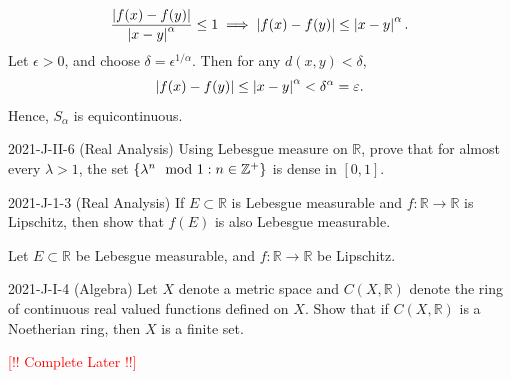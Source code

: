 \documentclass{article}
\begin{document}
\begin{solutions}
\begin{enumerate}[itemsep =-2pt,label = (\roman{*})]
				\begin{equation}
					\frac{\abs{f(x) - f(y)}}{\abs{x - y}^{\alpha}} \leq 1 \implies \abs{f(x) - f(y)} \leq \abs{x -y}^{\alpha}. 
				\end{equation}
			Let $\epsilon > 0$, and choose $\delta = \epsilon^{1/\alpha}$. Then for any $d(x, y) < \delta$, 
				\begin{equation}
					\abs{f(x) - f(y)} \leq \abs{x - y}^{\alpha} < \delta^{\alpha} = \epsilon. 
				\end{equation}
			Hence, $S_{\alpha}$ is equicontinuous. 
		\end{enumerate}
\end{solutions}

\begin{prb}{2021-J-II-6 (Real Analysis)}
	Using Lebesgue measure on $\mathbb{R}$, prove that for almost every $\lambda > 1$, the set $\brac*{\lambda^{n}\mod{1}: n \in \mathbb{Z}^{+}}$ is dense in $[0,1]$. 
\end{prb}


\begin{prb}{2021-J-1-3 (Real Analysis)}
	If $E \subset \mathbb{R}$ is Lebesgue measurable and $f: \mathbb{R} \to \mathbb{R}$ is Lipschitz, then show that $f(E)$ is also Lebesgue measurable. 
\end{prb}
\begin{solutions}
	Let $E \subset \mathbb{R}$ be Lebesgue measurable, and $f: \mathbb{R} \to \mathbb{R}$ be Lipschitz. 
\end{solutions}


\begin{prb}{2021-J-I-4 (Algebra)}
	Let $X$ denote a metric space and $C(X, \mathbb{R})$ denote the ring of continuous real valued functions defined on $X$. Show that if $C(X, \mathbb{R})$ is a Noetherian ring, then $X$ is a finite set. 
\end{prb}
\begin{solutions}
	\textcolor{red}{[!! Complete Later !!]}
\end{solutions}
\end{document}

